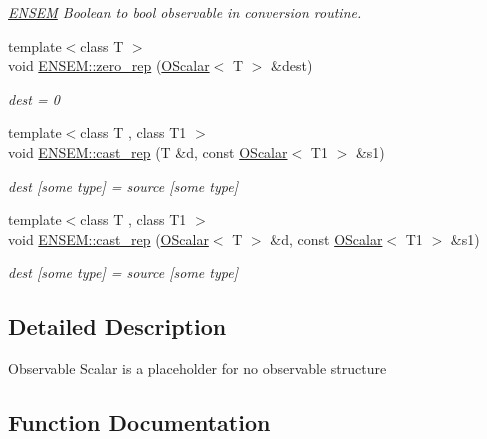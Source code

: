 \begin{DoxyCompactItemize}
\begin{DoxyCompactList}\small\item\em \mbox{\hyperlink{namespaceENSEM}{E\+N\+S\+EM}} Boolean to bool observable in conversion routine. \end{DoxyCompactList}\item 
{\footnotesize template$<$class T $>$ }\\void \mbox{\hyperlink{group__obsscalar_ga752f81e54e6f8f8362126b8d0668b340}{E\+N\+S\+E\+M\+::zero\+\_\+rep}} (\mbox{\hyperlink{classENSEM_1_1OScalar}{O\+Scalar}}$<$ T $>$ \&dest)
\begin{DoxyCompactList}\small\item\em dest = 0 \end{DoxyCompactList}\item 
{\footnotesize template$<$class T , class T1 $>$ }\\void \mbox{\hyperlink{group__obsscalar_gaf1b78a4937f88c01ae3300374d58d7f2}{E\+N\+S\+E\+M\+::cast\+\_\+rep}} (T \&d, const \mbox{\hyperlink{classENSEM_1_1OScalar}{O\+Scalar}}$<$ T1 $>$ \&s1)
\begin{DoxyCompactList}\small\item\em dest \mbox{[}some type\mbox{]} = source \mbox{[}some type\mbox{]} \end{DoxyCompactList}\item 
{\footnotesize template$<$class T , class T1 $>$ }\\void \mbox{\hyperlink{group__obsscalar_gaa5f9d1572097c605caade566731fe99a}{E\+N\+S\+E\+M\+::cast\+\_\+rep}} (\mbox{\hyperlink{classENSEM_1_1OScalar}{O\+Scalar}}$<$ T $>$ \&d, const \mbox{\hyperlink{classENSEM_1_1OScalar}{O\+Scalar}}$<$ T1 $>$ \&s1)
\begin{DoxyCompactList}\small\item\em dest \mbox{[}some type\mbox{]} = source \mbox{[}some type\mbox{]} \end{DoxyCompactList}\end{DoxyCompactItemize}


\subsection{Detailed Description}
Observable Scalar is a placeholder for no observable structure 

\subsection{Function Documentation}
\mbox{\label{group__obsscalar_ga734866f3eb39843cc901768dff4f6283}} 
